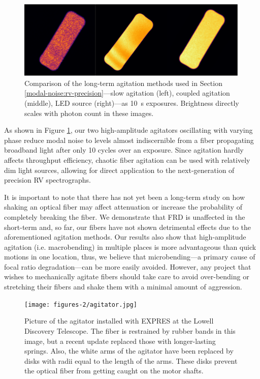 \begin{figure}
\centering
	\includegraphics[width=\columnwidth]{figures-2/fiber_rv_error.pdf}
	\caption[Comparison of long-term agitation methods]{Comparison of the long-term agitation methods used in Section \ref{modal-noise:rv-precision}---slow agitation (left), coupled agitation (middle), LED source (right)---as \SI{10}{\second} exposures. Brightness directly scales with photon count in these images.}
\label{fig:fiber_rv_error}
\end{figure}

As shown in Figure \ref{fig:fiber_rv_error}, our two high-amplitude agitators oscillating with varying phase reduce modal noise to levels almost indiscernible from a fiber propagating broadband light after only 10 cycles over an exposure. Since agitation hardly affects throughput efficiency, chaotic fiber agitation can be used with relatively dim light sources, allowing for direct application to the next-generation of precision RV spectrographs.

It is important to note that there has not yet been a long-term study on how shaking an optical fiber may affect attenuation or increase the probability of completely breaking the fiber. We demonstrate that FRD is unaffected in the short-term and, so far, our fibers have not shown detrimental effects due to the aforementioned agitation methods. Our results also show that high-amplitude agitation (i.e. macrobending) in multiple places is more advantageous than quick motions in one location, thus, we believe that microbending---a primary cause of focal ratio degradation---can be more easily avoided. However, any project that wishes to mechanically agitate fibers should take care to avoid over-bending or stretching their fibers and shake them with a minimal amount of aggression.

\begin{figure}
    \centering
    \texttt{[image: figures-2/agitator.jpg]}
    \caption[The EXPRES fiber agitator]{Picture of the agitator installed with EXPRES at the Lowell Discovery Telescope. The fiber is restrained by rubber bands in this image, but a recent update replaced those with longer-lasting springs. Also, the white arms of the agitator have been replaced by disks with radii equal to the length of the arms. These disks prevent the optical fiber from getting caught on the motor shafts.}
    \label{fig:agitator}
\end{figure}

